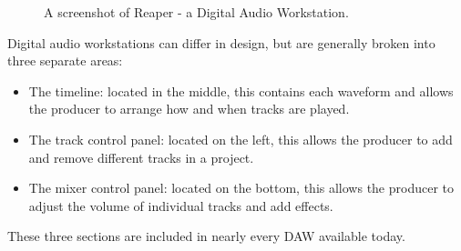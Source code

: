 \begin{figure}[h] %
	\begin{center}
		\caption{A screenshot of Reaper - a Digital Audio Workstation.}
	\end{center}
\end{figure}

Digital audio workstations can differ in design, but are generally broken into three separate areas:

\begin{itemize}
  \item The timeline: located in the middle, this contains each waveform and allows the producer to arrange how and when tracks are played.
  \item The track control panel: located on the left, this allows the producer to add and remove different tracks in a project.
  \item The mixer control panel: located on the bottom, this allows the producer to adjust the volume of individual tracks and add effects.
\end{itemize}

These three sections are included in nearly every DAW available today.

